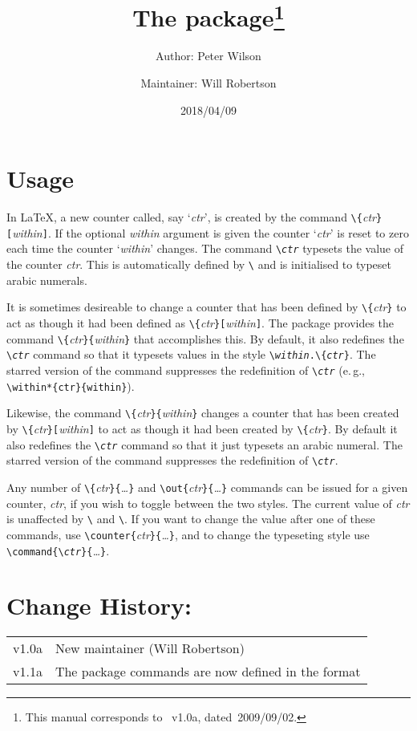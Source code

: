 \documentclass[DIV=7, pagesize=auto]{scrartcl}
\title{The \pkg{chngcntr} package\thanks{This manual corresponds to \pkg{chngcntr}~v1.0a, dated~2009/09/02.}}
\author{Author: Peter Wilson\and Maintainer: Will Robertson}
\date{2018/04/09}
\makeatletter
\newcommand*{\cs}[1]{\texttt{\textbackslash#1}}
\newcommand*{\cmd}[1]{\cs{\expandafter\@gobble\string#1}}
\newcommand*{\meta}[1]{\textlangle\textsl{#1}\textrangle}
\newcommand*{\marg}[1]{\texttt{\{}\meta{#1}\texttt{\}}}
\newcommand*{\oarg}[1]{\texttt{[}\meta{#1}\texttt{]}}
\newcommand*{\ml}[1]{\leavevmode\marginline{\small#1}\ignorespaces}
\makeatother
\begin{document}
\maketitle

\section{Usage}

In \LaTeX, a new counter called, say `\meta{ctr}', is created by the command
\cmd{\newcounter}\marg{ctr}\oarg{within}. If the optional \meta{within} argument is given
the counter `\meta{ctr}' is reset to zero each time the counter `\meta{within}'
changes. The command \cmd{\the\meta{ctr}} typesets the value of the counter \meta{ctr}.
This is automatically defined by \cmd{\newcounter} and is initialised
to typeset arabic numerals.	

\ml{\cmd{\counterwithin}\\\cmd{\counterwithin*}}
It is sometimes desireable to change a counter that has been defined
by \cmd{\newcounter}\marg{ctr} to act as though it had been defined as 
\cmd{\newcounter}\marg{ctr}\oarg{within}. The package provides the command
\cmd{\counterwithin}\marg{ctr}\marg{within} that accomplishes this. By default,
it also redefines the \cmd{\the\meta{ctr}} command so that it typesets values
in the style \texttt{\cmd{\the\meta{within}}.\cmd{\arabic}\marg{ctr}}. The starred version of the
command suppresses the redefinition of \cmd{\the\meta{ctr}}
(e.\,g., \cmd{\counter\-within*}\verb+{ctr}{within}+).

\ml{\cmd{\counterwithout}\\\cmd{\counterwithout*}}
Likewise, the command \cmd{\counterwithout}\marg{ctr}\marg{within} changes a
counter that has been created by \cmd{\newcounter}\marg{ctr}\oarg{within} to act
as though it had been created by \cmd{\newcounter}\marg{ctr}. By default it
also redefines the \cmd{\the\meta{ctr}} command so that it just typesets an arabic
numeral. The starred version of the command suppresses the redefinition
of \cmd{\the\meta{ctr}}.

Any number of \cmd{\counterwithin}\marg{ctr}\marg{\ldots} and \cmd{\counterwith\-out}\marg{ctr}\marg{\ldots}
commands can be issued for a given counter, \meta{ctr}, if you wish to toggle
between the two styles. The current value of \meta{ctr} is unaffected by
\cmd{\counterwithin} and \cmd{\counterwithout}. If you want to change the value
after one of these commands, use \cmd{\set\-counter}\marg{ctr}\marg{\ldots}, and to change
the typeseting style use \cmd{\renew\-command}\texttt{\{}\cmd{\the\meta{ctr}}\texttt{\}}\marg{\ldots}.


\section{Change History:}

\begin{tabular}{@{}l@{ -- }l@{}}
  v1.0a & New maintainer (Will Robertson)\\  
  v1.1a & The package commands are now defined in the format 
\end{tabular}
\end{document}
